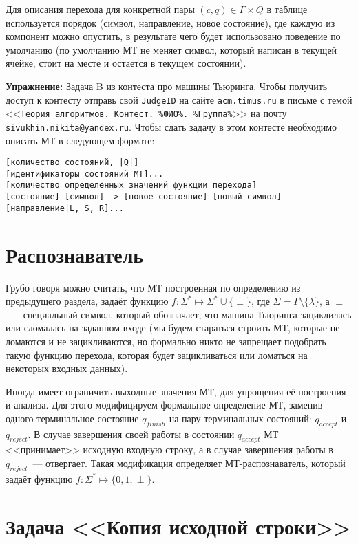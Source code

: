 \documentclass[
    11pt,
    a4paper
]{article}
\theoremstyle{definition}
\begin{document}
Для описания перехода для конкретной пары $(c, q) \in \Gamma \times Q$ в таблице используется порядок (символ, направление, новое состояние), где каждую из компонент можно опустить, в результате чего будет использовано поведение по умолчанию (по умолчанию МТ не меняет символ, который написан в текущей ячейке, стоит на месте и остается в текущем состоянии).

\textbf{Упражнение:} Задача B из контеста про машины Тьюринга. Чтобы получить доступ к контесту отправь свой \texttt{JudgeID} на сайте \texttt{acm.timus.ru} в письме с темой <<\texttt{Теория алгоритмов. Контест. \%ФИО\%. \%Группа\%}>> на почту \texttt{sivukhin.nikita@yandex.ru}. Чтобы сдать задачу в этом контесте необходимо описать МТ в следующем формате:
\begin{verbatim}
[количество состояний, |Q|]
[идентификаторы состояний МТ]...
[количество определённых значений функции перехода]
[состояние] [символ] -> [новое состояние] [новый символ] [направление|L, S, R]...
\end{verbatim}

\section{Распознаватель}

Грубо говоря можно считать, что МТ построенная по определению из предыдущего раздела, задаёт функцию $f: \Sigma^* \mapsto \Sigma^* \cup \{ \perp \}$, где $\Sigma = \Gamma \setminus \{ \lambda \}$, а $\perp$~--- специальный символ, который обозначает, что машина Тьюринга зациклилась или сломалась на заданном входе (мы будем стараться строить МТ, которые не ломаются и не зацикливаются, но формально никто не запрещает подобрать такую функцию перехода, которая будет зацикливаться или ломаться на некоторых входных данных). 

Иногда имеет ограничить выходные значения МТ, для упрощения её построения и анализа. Для этого модифицируем формальное определение МТ, заменив одного терминальное состояние $q_{finish}$ на пару терминальных состояний: $q_{accept}$ и $q_{reject}$. В случае завершения своей работы в состоянии $q_{accept}$ МТ <<принимает>> исходную входную строку, а в случае завершения работы в $q_{reject}$~--- отвергает. Такая модификация определяет МТ-распознаватель, который задаёт функцию $f: \Sigma^* \mapsto \{0, 1, \perp\}$.

\section{Задача <<Копия исходной строки>>}
\end{document}
